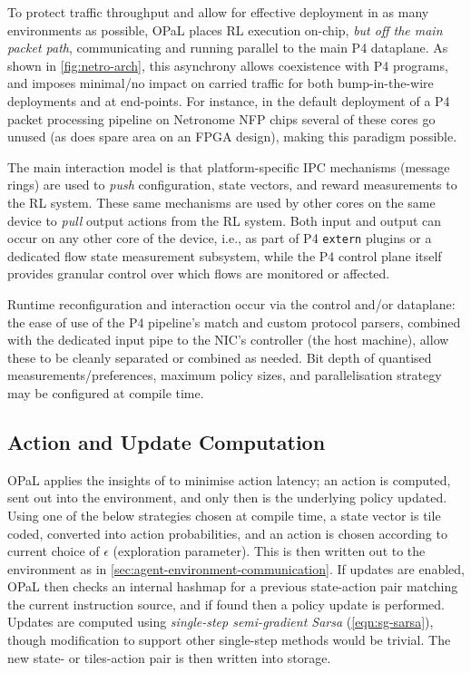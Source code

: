\documentclass[sigconf,natbib=false]{acmart}
\newcommand{\approachshort}{OPaL}
\begin{document}

To protect traffic throughput and allow for effective deployment in as many environments as possible, \approachshort{} places RL execution on-chip, \emph{but off the main packet path}, communicating and running parallel to the main P4 dataplane.
As shown in \cref{fig:netro-arch}, this asynchrony allows coexistence with P4 programs, and imposes minimal/no impact on carried traffic for both bump-in-the-wire deployments and at end-points.
For instance, in the default deployment of a P4 packet processing pipeline on Netronome NFP chips several of these cores go unused (as does spare area on an FPGA design), making this paradigm possible.

The main interaction model is that platform-specific IPC mechanisms (message rings) are used to \emph{push} configuration, state vectors, and reward measurements to the RL system.
These same mechanisms are used by other cores on the same device to \emph{pull} output actions from the RL system.
Both input and output can occur on any other core of the device, i.e., as part of P4 \texttt{extern} plugins or a dedicated flow state measurement subsystem, while the P4 control plane itself provides granular control over which flows are monitored or affected.

Runtime reconfiguration and interaction occur via the control and/or dataplane: the ease of use of the P4 pipeline's match and custom protocol parsers, combined with the dedicated input pipe to the NIC's controller (the host machine), allow these to be cleanly separated or combined as needed.
Bit depth of quantised measurements/preferences, maximum policy sizes, and parallelisation strategy may be configured at compile time.

\subsection{Action and Update Computation}
\approachshort{} applies the insights of \textcite{DBLP:journals/firai/TravnikMSP18} to minimise action latency; an action is computed, sent out into the environment, and only then is the underlying policy updated.
Using one of the below strategies chosen at compile time, a state vector is tile coded, converted into action probabilities, and an action is chosen according to current choice of $\epsilon$ (exploration parameter).
This is then written out to the environment as in \cref{sec:agent-environment-communication}.
If updates are enabled, \approachshort{} then checks an internal hashmap for a previous state-action pair matching the current instruction source, and if found then a policy update is performed.
Updates are computed using \emph{single-step semi-gradient Sarsa} (\cref{eqn:sg-sarsa}), though modification to support other single-step methods would be trivial.
The new state- or tiles-action pair is then written into storage.
\end{document}
